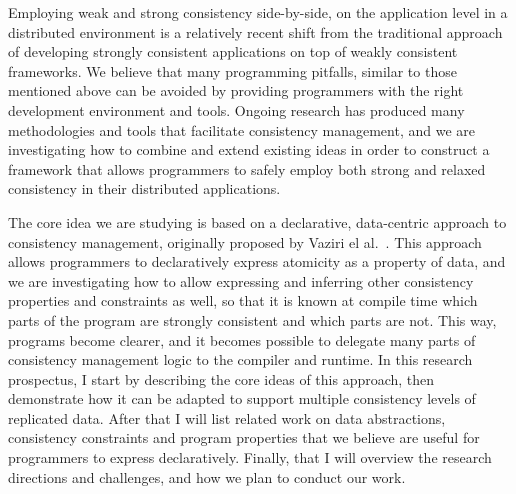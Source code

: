 \documentclass[]{usiinfprospectus}
\begin{document}
%
%
Employing weak and strong consistency side-by-side, on the application level in a distributed environment is a relatively recent shift from the traditional approach of developing strongly consistent applications on top of weakly consistent frameworks. We believe that many programming pitfalls, similar to those mentioned above can be avoided by providing programmers with the right development environment and tools. Ongoing research has produced many methodologies and tools that facilitate consistency management, and we are investigating how to combine and extend existing ideas in order to construct a framework that allows programmers to safely employ both strong and relaxed consistency in their distributed applications. 

The core idea we are studying is based on a declarative, data-centric approach to consistency management, originally proposed by Vaziri el al.~\cite{Vaziri:2006:ASC:1111320.1111067}. This approach allows programmers to declaratively express atomicity as a property of data, and we are investigating how to allow expressing and inferring other consistency properties and constraints as well, so that it is known at compile time which parts of the program are strongly consistent and which parts are not. This way, programs become clearer, and it becomes possible to delegate many parts of consistency management logic to the compiler and runtime. 
In this research prospectus, I start by describing the core ideas of this approach, then demonstrate how it can be adapted to support multiple consistency levels of replicated data. After that I will list related work on data abstractions, consistency constraints and program properties that we believe are useful for programmers to express declaratively. Finally, that I will overview the research directions and challenges, and how we plan to conduct our work.
\end{document}
